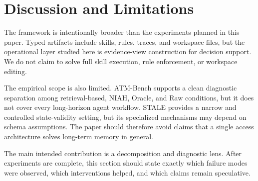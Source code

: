 \section{Discussion and Limitations}
\label{sec:limitations}

The framework is intentionally broader than the experiments planned in this paper.
Typed artifacts include skills, rules, traces, and workspace files, but the operational layer studied here is evidence-view construction for decision support.
We do not claim to solve full skill execution, rule enforcement, or workspace editing.

The empirical scope is also limited.
ATM-Bench supports a clean diagnostic separation among retrieval-based, NIAH, Oracle, and Raw conditions, but it does not cover every long-horizon agent workflow.
STALE provides a narrow and controlled state-validity setting, but its specialized mechanisms may depend on schema assumptions.
The paper should therefore avoid claims that a single access architecture solves long-term memory in general.

The main intended contribution is a decomposition and diagnostic lens.
After experiments are complete, this section should state exactly which failure modes were observed, which interventions helped, and which claims remain speculative.
